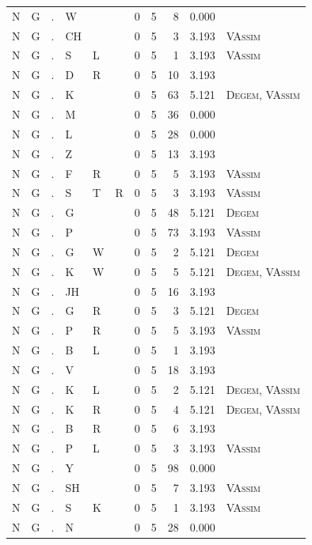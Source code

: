 \documentclass[12pt]{article}
\begin{document}
\begin{longtable}{r@{ } r@{ } c@{ } l@{ } l@{ } l@{ } r r r r l }
N & G & . & W &  &  & 0 & 5 & 8 & 0.000 &  \\
N & G & . & CH &  &  & 0 & 5 & 3 & 3.193 & \textsc{VAssim} \\
N & G & . & S & L &  & 0 & 5 & 1 & 3.193 & \textsc{VAssim} \\
N & G & . & D & R &  & 0 & 5 & 10 & 3.193 &  \\
N & G & . & K &  &  & 0 & 5 & 63 & 5.121 & \textsc{Degem}, \textsc{VAssim} \\
N & G & . & M &  &  & 0 & 5 & 36 & 0.000 &  \\
N & G & . & L &  &  & 0 & 5 & 28 & 0.000 &  \\
N & G & . & Z &  &  & 0 & 5 & 13 & 3.193 &  \\
N & G & . & F & R &  & 0 & 5 & 5 & 3.193 & \textsc{VAssim} \\
N & G & . & S & T & R & 0 & 5 & 3 & 3.193 & \textsc{VAssim} \\
N & G & . & G &  &  & 0 & 5 & 48 & 5.121 & \textsc{Degem} \\
N & G & . & P &  &  & 0 & 5 & 73 & 3.193 & \textsc{VAssim} \\
N & G & . & G & W &  & 0 & 5 & 2 & 5.121 & \textsc{Degem} \\
N & G & . & K & W &  & 0 & 5 & 5 & 5.121 & \textsc{Degem}, \textsc{VAssim} \\
N & G & . & JH &  &  & 0 & 5 & 16 & 3.193 &  \\
N & G & . & G & R &  & 0 & 5 & 3 & 5.121 & \textsc{Degem} \\
N & G & . & P & R &  & 0 & 5 & 5 & 3.193 & \textsc{VAssim} \\
N & G & . & B & L &  & 0 & 5 & 1 & 3.193 &  \\
N & G & . & V &  &  & 0 & 5 & 18 & 3.193 &  \\
N & G & . & K & L &  & 0 & 5 & 2 & 5.121 & \textsc{Degem}, \textsc{VAssim} \\
N & G & . & K & R &  & 0 & 5 & 4 & 5.121 & \textsc{Degem}, \textsc{VAssim} \\
N & G & . & B & R &  & 0 & 5 & 6 & 3.193 &  \\
N & G & . & P & L &  & 0 & 5 & 3 & 3.193 & \textsc{VAssim} \\
N & G & . & Y &  &  & 0 & 5 & 98 & 0.000 &  \\
N & G & . & SH &  &  & 0 & 5 & 7 & 3.193 & \textsc{VAssim} \\
N & G & . & S & K &  & 0 & 5 & 1 & 3.193 & \textsc{VAssim} \\
N & G & . & N &  &  & 0 & 5 & 28 & 0.000 &  \\

\end{longtable}
\end{document}
